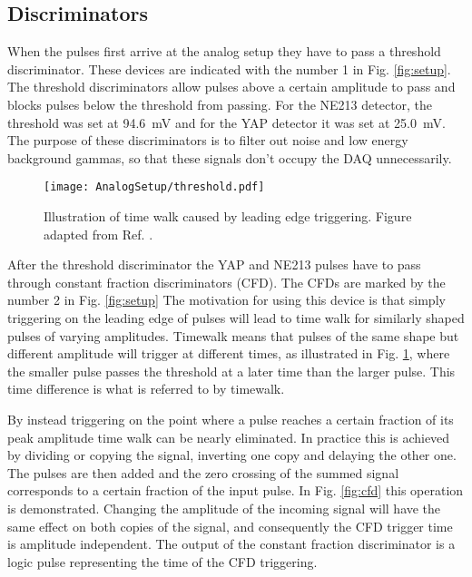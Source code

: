 \documentclass[main.tex]{subfiles}
\begin{document}
\subsection{Discriminators}
When the pulses first arrive at the analog setup they have to pass a threshold discriminator. These devices are indicated with the number 1 in Fig. \ref{fig:setup}. The threshold discriminators allow pulses above a certain amplitude to pass and blocks pulses below the threshold from passing. For the NE213 detector, the threshold was set at \SI{94.6}{mV} and for the YAP detector it was set at \SI{25.0}{mV}. The purpose of these discriminators is to filter out noise and low energy background gammas, so that these signals don't occupy the DAQ unnecessarily.

\begin{figure}[h]
    \centering
        \texttt{[image: AnalogSetup/threshold.pdf]}
        \caption[Threshold discriminators and time walk]{Illustration of time walk caused by leading edge triggering. Figure adapted from Ref. \cite{rofors}.}
    \label{fig:discriminator}
\end{figure}

After the threshold discriminator the YAP and NE213 pulses have to pass through constant fraction discriminators (CFD). The CFDs are marked by the number 2 in Fig. \ref{fig:setup} The motivation for using this device is that simply triggering on the leading edge of pulses will lead to time walk for similarly shaped pulses of varying amplitudes. Timewalk means that pulses of the same shape but different amplitude will trigger at different times, as illustrated in Fig. \ref{fig:discriminator}, where the smaller pulse passes the threshold at a later time than the larger pulse. This time difference is what is referred to by timewalk. 

By instead triggering on the point where a pulse reaches a certain fraction of its peak amplitude time walk can be nearly eliminated\citep[pg.327]{Leo}. In practice this is achieved by dividing or copying the signal, inverting one copy and delaying the other one. The pulses are then added and the zero crossing of the summed signal corresponds to a certain fraction of the input pulse. In Fig. \ref{fig:cfd} this operation is demonstrated. Changing the amplitude of the incoming signal will have the same effect on both copies of the signal, and consequently the CFD trigger time is amplitude independent. The output of the constant fraction discriminator is a logic pulse representing the time of the CFD triggering.
\end{document}
